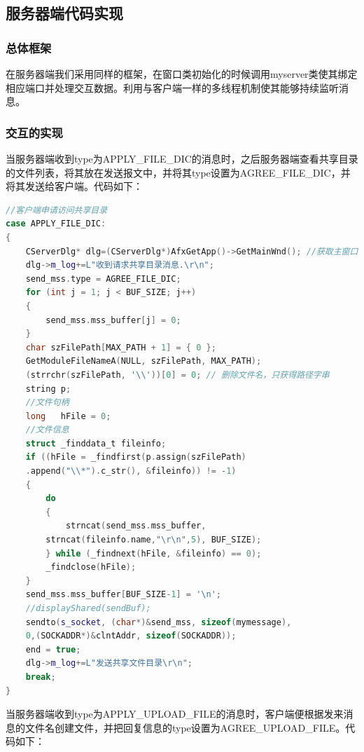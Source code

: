 \subsection{服务器端代码实现}

\subsubsection{总体框架}

在服务器端我们采用同样的框架，在窗口类初始化的时候调用myserver类使其绑定相应端口并处理交互数据。利用与客户端一样的多线程机制使其能够持续监听消息。

\subsubsection{交互的实现}

当服务器端收到type为APPLY\_FILE\_DIC的消息时，之后服务器端查看共享目录的文件列表，将其放在发送报文中，并将其type设置为AGREE\_FILE\_DIC，并将其发送给客户端。代码如下：

\begin{flushleft}
\begin{lstlisting}[language={C++},basicstyle=\footnotesize]
//客户端申请访问共享目录
case APPLY_FILE_DIC:
{
	CServerDlg* dlg=(CServerDlg*)AfxGetApp()->GetMainWnd(); //获取主窗口
	dlg->m_log+=L"收到请求共享目录消息.\r\n";
	send_mss.type = AGREE_FILE_DIC;
	for (int j = 1; j < BUF_SIZE; j++)
	{
		send_mss.mss_buffer[j] = 0;
	}
	char szFilePath[MAX_PATH + 1] = { 0 };
	GetModuleFileNameA(NULL, szFilePath, MAX_PATH);
	(strrchr(szFilePath, '\\'))[0] = 0; // 删除文件名，只获得路径字串
	string p;
	//文件句柄
	long   hFile = 0;
	//文件信息
	struct _finddata_t fileinfo;
	if ((hFile = _findfirst(p.assign(szFilePath)
    .append("\\*").c_str(), &fileinfo)) != -1)
	{
		do
		{
			strncat(send_mss.mss_buffer, 
        strncat(fileinfo.name,"\r\n",5), BUF_SIZE);
		} while (_findnext(hFile, &fileinfo) == 0);
		_findclose(hFile);
	}
	send_mss.mss_buffer[BUF_SIZE-1] = '\n';
	//displayShared(sendBuf);
	sendto(s_socket, (char*)&send_mss, sizeof(mymessage), 
    0,(SOCKADDR*)&clntAddr, sizeof(SOCKADDR));
	end = true;
	dlg->m_log+=L"发送共享文件目录\r\n";
	break;
}
\end{lstlisting}
\end{flushleft}

当服务器端收到type为APPLY\_UPLOAD\_FILE的消息时，客户端便根据发来消息的文件名创建文件，并把回复信息的type设置为AGREE\_UPLOAD\_FILE。代码如下：

